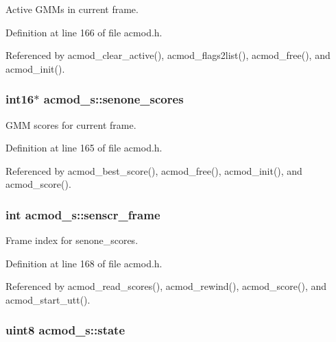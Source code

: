 Active G\-M\-Ms in current frame. 



Definition at line 166 of file acmod.\-h.



Referenced by acmod\-\_\-clear\-\_\-active(), acmod\-\_\-flags2list(), acmod\-\_\-free(), and acmod\-\_\-init().

\subsubsection[{senone\-\_\-scores}]{\setlength{\rightskip}{0pt plus 5cm}int16$\ast$ acmod\-\_\-s\-::senone\-\_\-scores}\label{structacmod__s_aa341539b98a5b13bef8589fc8d948da8}


G\-M\-M scores for current frame. 



Definition at line 165 of file acmod.\-h.



Referenced by acmod\-\_\-best\-\_\-score(), acmod\-\_\-free(), acmod\-\_\-init(), and acmod\-\_\-score().

\subsubsection[{senscr\-\_\-frame}]{\setlength{\rightskip}{0pt plus 5cm}int acmod\-\_\-s\-::senscr\-\_\-frame}\label{structacmod__s_ab70ba4caf96b656936d499247e921f00}


Frame index for senone\-\_\-scores. 



Definition at line 168 of file acmod.\-h.



Referenced by acmod\-\_\-read\-\_\-scores(), acmod\-\_\-rewind(), acmod\-\_\-score(), and acmod\-\_\-start\-\_\-utt().

\subsubsection[{state}]{\setlength{\rightskip}{0pt plus 5cm}uint8 acmod\-\_\-s\-::state}\label{structacmod__s_a06adf606c11e6f4b9869742510a5c23b}


